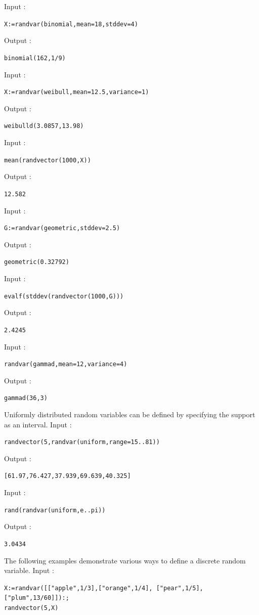 Input :
\begin{center}
  \tt X:=randvar(binomial,mean=18,stddev=4)
\end{center}
Output :
\begin{center}
  \tt binomial(162,1/9)
\end{center}
Input :
\begin{center}
  \tt X:=randvar(weibull,mean=12.5,variance=1)
\end{center}
Output :
\begin{center}
  \tt weibulld(3.0857,13.98)
\end{center}
Input :
\begin{center}
  \tt mean(randvector(1000,X))
\end{center}
Output :
\begin{center}
  \tt 12.582
\end{center}
Input :
\begin{center}
  \tt G:=randvar(geometric,stddev=2.5)
\end{center}
Output :
\begin{center}
  \tt geometric(0.32792)
\end{center}
Input :
\begin{center}
  \tt evalf(stddev(randvector(1000,G)))
\end{center}
Output :
\begin{center}
  \tt 2.4245
\end{center}
Input :
\begin{center}
  \tt randvar(gammad,mean=12,variance=4)
\end{center}
Output :
\begin{center}
  \tt gammad(36,3)
\end{center}
Uniformly distributed random variables can be defined by specifying the support as an interval. Input :
\begin{center}
  \tt randvector(5,randvar(uniform,range=15..81))
\end{center}
Output :
\begin{center}
  \tt [61.97,76.427,37.939,69.639,40.325]
\end{center}
Input :
\begin{center}
  \tt rand(randvar(uniform,e..pi))
\end{center}
Output :
\begin{center}
  \tt 3.0434
\end{center}
The following examples demonstrate various ways to define a discrete random variable. Input :
\begin{center}
  \tt X:=randvar([["apple",1/3],["orange",1/4], ["pear",1/5],["plum",13/60]]):;\\randvector(5,X)
\end{center}
